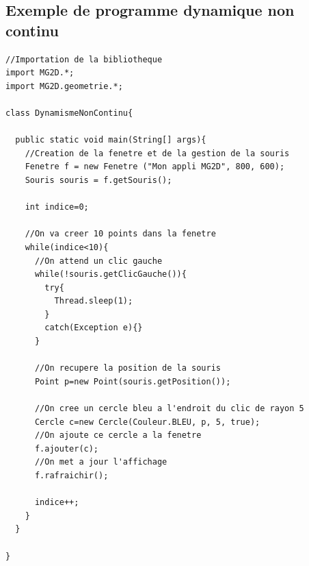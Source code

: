 \documentclass[12pt]{exam}
\begin{document}
\subsection{Exemple de programme dynamique non continu}
\label{dynNonContinu}
\begin{lstlisting}
//Importation de la bibliotheque
import MG2D.*;
import MG2D.geometrie.*;

class DynamismeNonContinu{

  public static void main(String[] args){
    //Creation de la fenetre et de la gestion de la souris
    Fenetre f = new Fenetre ("Mon appli MG2D", 800, 600);
    Souris souris = f.getSouris();

    int indice=0;
    
    //On va creer 10 points dans la fenetre
    while(indice<10){
      //On attend un clic gauche
      while(!souris.getClicGauche()){
        try{
          Thread.sleep(1);
        }
        catch(Exception e){}
      }
      
      //On recupere la position de la souris
      Point p=new Point(souris.getPosition());
      
      //On cree un cercle bleu a l'endroit du clic de rayon 5
      Cercle c=new Cercle(Couleur.BLEU, p, 5, true);  
      //On ajoute ce cercle a la fenetre
      f.ajouter(c); 
      //On met a jour l'affichage
      f.rafraichir();
      
      indice++;
    }
  }
    
}
\end{lstlisting}
\end{document}
